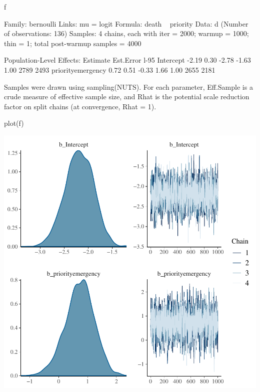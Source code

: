 \begin{Schunk}
\begin{Sinput}
f
\end{Sinput}
\begin{Soutput}
 Family: bernoulli 
  Links: mu = logit 
Formula: death ~ priority 
   Data: d (Number of observations: 136) 
Samples: 4 chains, each with iter = 2000; warmup = 1000; thin = 1;
         total post-warmup samples = 4000

Population-Level Effects: 
                  Estimate Est.Error l-95%
Intercept            -2.19      0.30    -2.78    -1.63 1.00     2789     2493
priorityemergency     0.72      0.51    -0.33     1.66 1.00     2655     2181

Samples were drawn using sampling(NUTS). For each parameter, Eff.Sample 
is a crude measure of effective sample size, and Rhat is the potential 
scale reduction factor on split chains (at convergence, Rhat = 1).
\end{Soutput}
\begin{Sinput}
plot(f)
\end{Sinput}


\centerline{\includegraphics[width=\maxwidth]{prop-bayesprop2-1} }

\end{Schunk}

